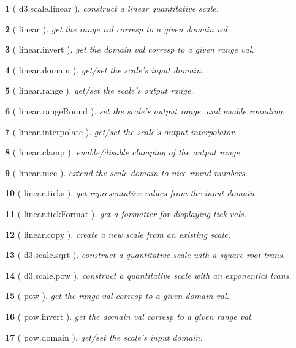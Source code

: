 \documentclass[10pt,landscape,letterpaper]{article}
\newcounter{thm}
\theoremstyle{mytheoremstyle}
\newtheorem*{thm}{}
\begin{document}
\begin{multicols}{3}
\begin{thm} [ d3.scale.linear ]  construct a linear quantitative scale.
\end{thm}\begin{thm} [ linear ]  get the range val corresp to a given domain val.
\end{thm}\begin{thm} [ linear.invert ]  get the domain val corresp to a given range val.
\end{thm}\begin{thm} [ linear.domain ]  get/set the scale's input domain.
\end{thm}\begin{thm} [ linear.range ]  get/set the scale's output range.
\end{thm}\begin{thm} [ linear.rangeRound ]  set the scale's output range, and enable rounding.
\end{thm}\begin{thm} [ linear.interpolate ]  get/set the scale's output interpolator.
\end{thm}\begin{thm} [ linear.clamp ]  enable/disable clamping of the output range.
\end{thm}\begin{thm} [ linear.nice ]  extend the scale domain to nice round numbers.
\end{thm}\begin{thm} [ linear.ticks ]  get representative values from the input domain.
\end{thm}\begin{thm} [ linear.tickFormat ]  get a formatter for displaying tick vals.
\end{thm}\begin{thm} [ linear.copy ]  create a new scale from an existing scale.
\end{thm}\begin{thm} [ d3.scale.sqrt ]  construct a quantitative scale with a square root trans.
\end{thm}\begin{thm} [ d3.scale.pow ]  construct a quantitative scale with an exponential trans.
\end{thm}\begin{thm} [ pow ]  get the range val corresp to a given domain val.
\end{thm}\begin{thm} [ pow.invert ]  get the domain val corresp to a given range val.
\end{thm}\begin{thm} [ pow.domain ]  get/set the scale's input domain.

\end{thm}
\end{multicols}
\end{document}
